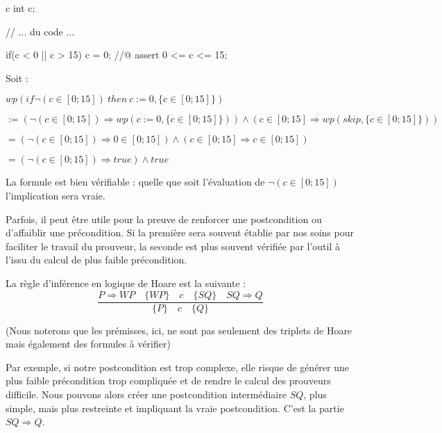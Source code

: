 \begin{CodeBlock}{c}
int c;

// ... du code ...

if(c < 0 || c > 15){
  c = 0;
}
//@ assert 0 <= c <= 15;
\end{CodeBlock}



Soit :



$wp(if \neg (c \in [0;15])\ then\ c := 0, \{c \in [0;15]\})$



$:= (\neg (c \in [0;15])\Rightarrow wp(c := 0, \{c \in [0;15]\})) \wedge (c \in [0;15]\Rightarrow wp(skip, \{c \in [0;15]\}))$



$= (\neg (c \in [0;15]) \Rightarrow 0 \in [0;15]) \wedge (c \in [0;15] \Rightarrow c \in [0;15])$



$= (\neg (c \in [0;15]) \Rightarrow true) \wedge true$



La formule est bien vérifiable : quelle que soit l'évaluation de $\neg (c \in [0;15])$ l'implication sera vraie.


\label{l3:statements-basic-consequence}



Parfois, il peut être utile pour la preuve de renforcer une postcondition ou 
d'affaiblir une précondition. Si la première sera souvent établie par nos soins
pour faciliter le travail du prouveur, la seconde est plus souvent vérifiée 
par l'outil à l'issu du calcul de plus faible précondition.



La règle d'inférence en logique de Hoare est la suivante :
$$\dfrac{P \Rightarrow WP \quad \{WP\}\quad c\quad \{SQ\} \quad SQ \Rightarrow Q}{\{P\}\quad c \quad \{Q\}}$$



(Nous noterons que les prémisses, ici, ne sont pas seulement des triplets de
Hoare mais également des formules à vérifier)



Par exemple, si notre postcondition est trop complexe, elle risque de générer
une plus faible précondition trop compliquée et de rendre le calcul des 
prouveurs difficile. Nous pouvons alors créer une postcondition intermédiaire
$SQ$, plus simple, mais plus restreinte et impliquant la vraie postcondition. 
C'est la partie $SQ \Rightarrow Q$.



